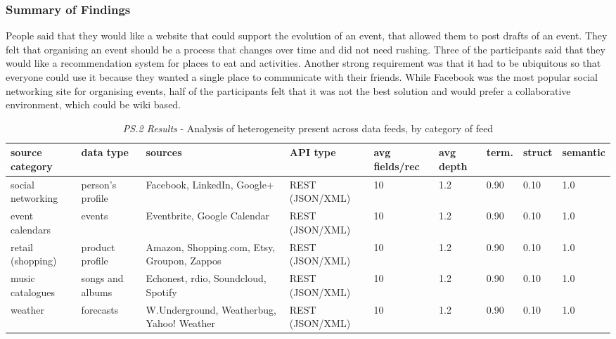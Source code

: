 \documentclass{sigchi}
\begin{document}
\subsubsection{Summary of Findings}
People said that they would like a website that could support the evolution of an event, that allowed them to post drafts of an event.  They felt that organising an event should be a process that changes over time and did not need rushing.  Three of the participants said that they would like a recommendation system for places to eat and activities. Another strong requirement was that it had to be ubiquitous so that everyone could use it because they wanted a single place to communicate with their friends.  While Facebook was the most popular social networking site for organising events, half of the participants felt that it was not the best solution and would prefer a collaborative environment, which could be wiki based.

\begin{table}
\small
\begin{tabular}{| p{2.0cm} | p{1.5cm} | p{3.6cm} | p{2cm} | p{2cm} | l | l | l | l |}
\hline
source category  & data type & sources & API type & avg fields/rec & avg depth & term. & struct & semantic \\
\hline
social networking  & person's profile & Facebook, LinkedIn, Google+ & REST (JSON/XML) & 10 & 1.2 & 0.90 & 0.10 & 1.0 \\
event calendars & events & Eventbrite, Google Calendar  & REST (JSON/XML) & 10 & 1.2 & 0.90 & 0.10 & 1.0 \\
retail (shopping)  & product profile & Amazon, Shopping.com, Etsy, Groupon, Zappos  & REST (JSON/XML) & 10 & 1.2 & 0.90 & 0.10 & 1.0 \\
music catalogues & songs and albums & Echonest, rdio, Soundcloud, Spotify  & REST (JSON/XML) & 10 & 1.2 & 0.90 & 0.10 & 1.0 \\
weather & forecasts & W.Underground, Weatherbug, Yahoo! Weather & REST (JSON/XML) & 10 & 1.2 & 0.90 & 0.10 & 1.0 \\
\hline
\end{tabular}
\caption{\emph{PS.2 Results} - Analysis of heterogeneity present across data feeds, by category of feed}\label{tbl:prestudy2}

\end{table}
\end{document}
